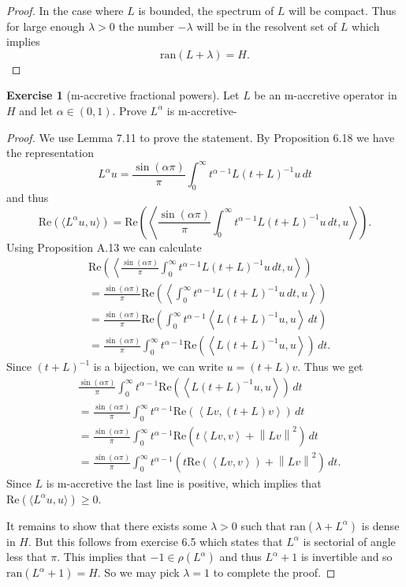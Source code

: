 \documentclass[a4paper,11pt]{article}
\newcommand{\norm}[1]{\left\lVert#1\right\rVert} %
\newcommand{\re}{\mathrm{Re}}
\newcommand{\im}{\mathrm{ran}}
\theoremstyle{definition}
\newtheorem{exercise}{Exercise}
\begin{document}
\begin{proof}
    In the case where $L$ is bounded, the spectrum of $L$ will be compact. Thus for large enough $\lambda > 0$ the number $-\lambda$ will be in the resolvent set of $L$ which implies 
    \[\im(L+\lambda) = H.\]
\end{proof}

\begin{exercise}[m-accretive fractional powers]
    Let $L$ be an m-accretive operator in $H$ and let $\alpha \in (0,1)$. Prove $L^\alpha$ is m-accretive- 
\end{exercise}

\begin{proof}
    We use Lemma 7.11 to prove the statement.
    By Proposition 6.18 we have the representation 
    \[L^\alpha u=\frac{\sin(\alpha\pi)}{\pi}\int_0^\infty t^{\alpha-1}L(t+L)^{-1}u\, dt\]
    and thus
    \[\re\left(\langle L^\alpha u,u\rangle\right) = \re\left(\left\langle \frac{\sin(\alpha\pi)}{\pi}\int_0^\infty t^{\alpha-1}L(t+L)^{-1}u\, dt,u\right\rangle\right).\]
    Using Proposition A.13 we can calculate
    \begin{align*}
        &\re\left(\left\langle \frac{\sin(\alpha\pi)}{\pi}\int_0^\infty t^{\alpha-1}L(t+L)^{-1}u\, dt,u\right\rangle\right) \\
        &= \frac{\sin(\alpha\pi)}{\pi} \re\left(\left\langle \int_0^\infty t^{\alpha-1}L(t+L)^{-1}u\, dt,u\right\rangle\right) \\
        &= \frac{\sin(\alpha\pi)}{\pi} \re\left(\int_0^\infty t^{\alpha-1}\left\langle L(t+L)^{-1}u ,u\right\rangle \,dt\right) \\
        &= \frac{\sin(\alpha\pi)}{\pi} \int_0^\infty t^{\alpha-1}\re\left(\left\langle L(t+L)^{-1}u ,u\right\rangle\right)\,dt.
    \end{align*}
    Since $(t+L)^{-1}$ is a bijection, we can write $u=(t+L)v$. Thus we get
    \begin{align*}
        &\frac{\sin(\alpha\pi)}{\pi} \int_0^\infty t^{\alpha-1}\re\left(\left\langle L(t+L)^{-1}u ,u\right\rangle\right)\,dt \\
        &= \frac{\sin(\alpha\pi)}{\pi} \int_0^\infty t^{\alpha-1}\re\left(\left\langle Lv ,(t+L)v\right\rangle\right)\,dt \\
        &= \frac{\sin(\alpha\pi)}{\pi} \int_0^\infty t^{\alpha-1}\re\left(t\left\langle Lv, v\right\rangle + \norm{Lv}^2\right)\,dt \\
        &= \frac{\sin(\alpha\pi)}{\pi} \int_0^\infty t^{\alpha-1}\left(t \re\left(\left\langle Lv, v\right\rangle\right) + \norm{Lv}^2\right) \,dt.
    \end{align*}
Since $L$ is m-accretive the last line is positive, which implies that $\re(\langle L^\alpha u,u\rangle) \ge0$. 

It remains to show that there exists some $\lambda > 0$ such that $\im(\lambda+L^\alpha)$ is dense in $H$. 
But this follows from exercise 6.5 which states that $L^\alpha$ is sectorial of angle less that $\pi$.
This implies that $-1\in \rho(L^\alpha)$ and thus $L^\alpha+1$ is invertible and so $\im(L^\alpha+1)=H$.
So we may pick $\lambda = 1$ to complete the proof. 
\end{proof}
\end{document}
